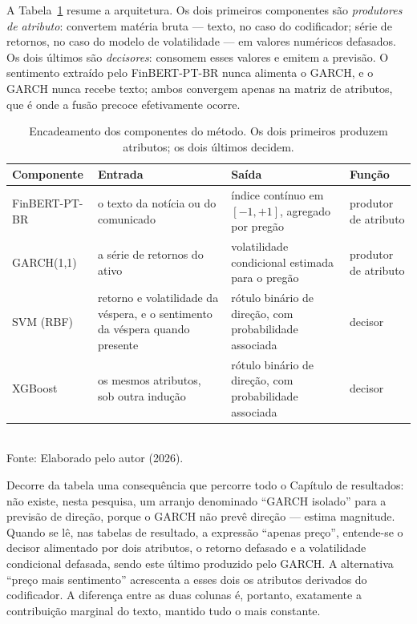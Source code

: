A Tabela~\ref{tab:cadeia} resume a arquitetura. Os dois primeiros componentes são \emph{produtores de atributo}: convertem matéria bruta --- texto, no caso do codificador; série de retornos, no caso do modelo de volatilidade --- em valores numéricos defasados. Os dois últimos são \emph{decisores}: consomem esses valores e emitem a previsão. O sentimento extraído pelo FinBERT-PT-BR nunca alimenta o GARCH, e o GARCH nunca recebe texto; ambos convergem apenas na matriz de atributos, que é onde a fusão precoce efetivamente ocorre.

\begin{table}[htpb]
\centering
\caption{Encadeamento dos componentes do método. Os dois primeiros produzem atributos; os dois últimos decidem.}
\label{tab:cadeia}
\begin{tabular}{p{2.6cm} p{4.3cm} p{4.3cm} p{2.6cm}}
\hline
\textbf{Componente} & \textbf{Entrada} & \textbf{Saída} & \textbf{Função} \\ \hline
FinBERT-PT-BR & o texto da notícia ou do comunicado & índice contínuo em $[-1,+1]$, agregado por pregão & produtor de atributo \\
GARCH(1,1) & a série de retornos do ativo & volatilidade condicional estimada para o pregão & produtor de atributo \\
SVM (RBF) & retorno e volatilidade da véspera, e o sentimento da véspera quando presente & rótulo binário de direção, com probabilidade associada & decisor \\
XGBoost & os mesmos atributos, sob outra indução & rótulo binário de direção, com probabilidade associada & decisor \\
\hline
\end{tabular}
\vspace{0.2cm}
{\small \\ Fonte: Elaborado pelo autor (2026).}
\end{table}

Decorre da tabela uma consequência que percorre todo o Capítulo de resultados: não existe, nesta pesquisa, um arranjo denominado ``GARCH isolado'' para a previsão de direção, porque o GARCH não prevê direção --- estima magnitude. Quando se lê, nas tabelas de resultado, a expressão ``apenas preço'', entende-se o decisor alimentado por dois atributos, o retorno defasado e a volatilidade condicional defasada, sendo este último produzido pelo GARCH. A alternativa ``preço mais sentimento'' acrescenta a esses dois os atributos derivados do codificador. A diferença entre as duas colunas é, portanto, exatamente a contribuição marginal do texto, mantido tudo o mais constante.


